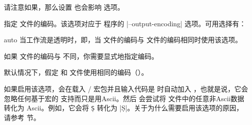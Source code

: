 \begin{optionlist}
\begin{valuelist}
\end{valuelist}
%
请注意如果，那么设置  也会影响  选项。


指定  文件的编码。该选项对应于 \biber 程序的 |--output-encoding| 选项。可用选择有：

\begin{valuelist}

\item[auto] %
当工作流是透明时，即，当  文件的编码与  文件的编码相同时使用该选项。

\item[\prm{encoding}] %
如果  文件的编码与  不同，你需要显式地指定编码。

\end{valuelist}

默认情况下，\biblatex 假定  和  文件使用相同的编码（）。


如果启用该选项，\biblatex 会在载入 \slash {} 宏包并且输入代码是 \utf 时自动加入 ，也就是说，它会忽略任何基于宏的 \utf 支持而只是用Ascii。然后 \biber 会尝试将  文件中的任意非Ascii数据转化为 Ascii。例如，它会将 \texttt{\d{S}} 转化为 |\d{S}|。关于为什么需要启用该选项的原因，请参考  节。


\end{optionlist}

